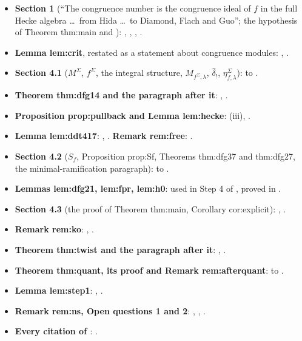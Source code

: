 \begin{itemize}
\item \textbf{Section 1} (``The congruence number is the congruence ideal of $f$ in the full Hecke algebra \dots\ from Hida \dots\ to Diamond, Flach and Guo''; the hypothesis of Theorem thm:main and
\cite[Theorem 0.1]{DFG04}): , , , .
\item \textbf{Lemma lem:crit}, restated as a statement about congruence modules: , .
\item \textbf{Section 4.1} ($M^\Sigma$, $f^\Sigma$, the integral structure, $M_{f^\Sigma,\lambda}$, $\hat\delta_!$, $\eta^\Sigma_{f,\lambda}$):  to .
\item \textbf{Theorem thm:dfg14 and the paragraph after it}: , .
\item \textbf{Proposition prop:pullback and Lemma lem:hecke}: (iii), .
\item \textbf{Lemma lem:ddt417}: , . \textbf{Remark rem:free}: .
\item \textbf{Section 4.2} ($S_f$, Proposition prop:Sf, Theorems thm:dfg37 and thm:dfg27, the minimal-ramification paragraph):  to .
\item \textbf{Lemmas lem:dfg21, lem:fpr, lem:h0}: used in Step 4 of , proved in .
\item \textbf{Section 4.3} (the proof of Theorem thm:main, Corollary cor:explicit): , .
\item \textbf{Remark rem:ko}: , .
\item \textbf{Theorem thm:twist and the paragraph after it}: , .
\item \textbf{Theorem thm:quant, its proof and Remark rem:afterquant}:  to .
\item \textbf{Lemma lem:step1}: , .
\item \textbf{Remark rem:ns, Open questions 1 and 2}: , , .
\item \textbf{Every citation of \cite{DFG04}}: .
\end{itemize}

